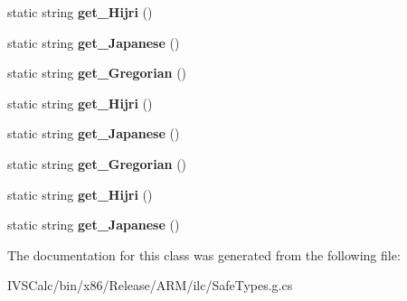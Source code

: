 \begin{DoxyCompactItemize}
static string {\bfseries get\+\_\+\+Hijri} ()
\item 
\mbox{\label{class_windows_1_1_globalization_1_1_calendar_identifiers_aa726be443276ec8a4a185437818808c8}} 
static string {\bfseries get\+\_\+\+Japanese} ()
\item 
\mbox{\label{class_windows_1_1_globalization_1_1_calendar_identifiers_a709801d2dbde621a4207ab44e3cfbf22}} 
static string {\bfseries get\+\_\+\+Gregorian} ()
\item 
\mbox{\label{class_windows_1_1_globalization_1_1_calendar_identifiers_a3c796d09cbe6d73477fa6159b063aac1}} 
static string {\bfseries get\+\_\+\+Hijri} ()
\item 
\mbox{\label{class_windows_1_1_globalization_1_1_calendar_identifiers_aa726be443276ec8a4a185437818808c8}} 
static string {\bfseries get\+\_\+\+Japanese} ()
\item 
\mbox{\label{class_windows_1_1_globalization_1_1_calendar_identifiers_a709801d2dbde621a4207ab44e3cfbf22}} 
static string {\bfseries get\+\_\+\+Gregorian} ()
\item 
\mbox{\label{class_windows_1_1_globalization_1_1_calendar_identifiers_a3c796d09cbe6d73477fa6159b063aac1}} 
static string {\bfseries get\+\_\+\+Hijri} ()
\item 
\mbox{\label{class_windows_1_1_globalization_1_1_calendar_identifiers_aa726be443276ec8a4a185437818808c8}} 
static string {\bfseries get\+\_\+\+Japanese} ()
\end{DoxyCompactItemize}


The documentation for this class was generated from the following file\+:\begin{DoxyCompactItemize}
\item 
I\+V\+S\+Calc/bin/x86/\+Release/\+A\+R\+M/ilc/Safe\+Types.\+g.\+cs\end{DoxyCompactItemize}
